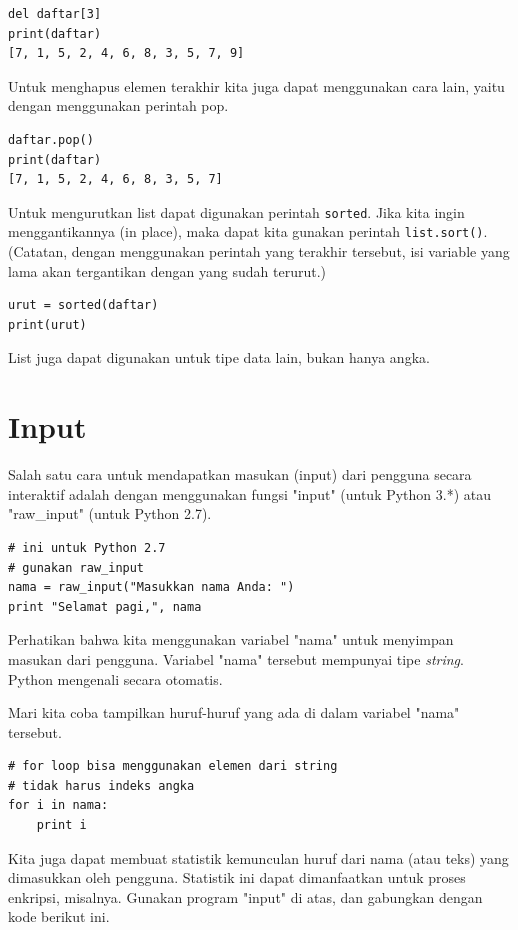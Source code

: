 \begin{verbatim}
del daftar[3]
print(daftar)
[7, 1, 5, 2, 4, 6, 8, 3, 5, 7, 9]
\end{verbatim}

Untuk menghapus elemen terakhir kita juga dapat menggunakan cara lain,
yaitu dengan menggunakan perintah pop.

\begin{verbatim}
daftar.pop()
print(daftar)
[7, 1, 5, 2, 4, 6, 8, 3, 5, 7]
\end{verbatim}

Untuk mengurutkan list dapat digunakan perintah {\tt sorted}.
Jika kita ingin menggantikannya (in place), maka dapat kita gunakan
perintah {\tt list.sort()}. (Catatan, dengan menggunakan perintah yang
terakhir tersebut, isi variable yang lama akan tergantikan dengan
yang sudah terurut.)
\begin{verbatim}
urut = sorted(daftar)
print(urut)
\end{verbatim}

List juga dapat digunakan untuk tipe data lain, bukan hanya angka.

\section{Input}
Salah satu cara untuk mendapatkan masukan (input) dari pengguna secara
interaktif adalah dengan menggunakan fungsi "input" (untuk Python 3.*)
atau "raw\_input" (untuk Python 2.7).

\begin{verbatim}
# ini untuk Python 2.7
# gunakan raw_input
nama = raw_input("Masukkan nama Anda: ")
print "Selamat pagi,", nama
\end{verbatim}

Perhatikan bahwa kita menggunakan variabel "nama" untuk menyimpan masukan
dari pengguna. Variabel "nama" tersebut mempunyai tipe {\em string}.
Python mengenali secara otomatis.

Mari kita coba tampilkan huruf-huruf yang ada di dalam variabel "nama"
tersebut.

\begin{verbatim}
# for loop bisa menggunakan elemen dari string
# tidak harus indeks angka
for i in nama:
    print i
\end{verbatim}

Kita juga dapat membuat statistik kemunculan huruf dari nama (atau teks)
yang dimasukkan oleh pengguna. Statistik ini dapat dimanfaatkan untuk
proses enkripsi, misalnya. Gunakan program "input" di atas, dan gabungkan
dengan kode berikut ini.

